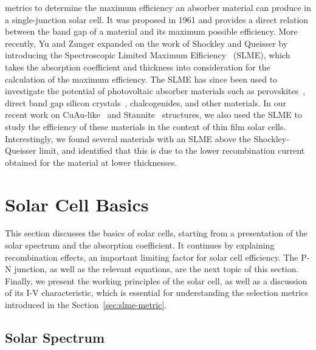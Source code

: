 \begin{refsection}
 
% 
metrics to determine the maximum efficiency an absorber material can produce 
in a single-junction solar cell. It was proposed in 1961 and provides a direct 
relation between the band gap of a material and its maximum possible 
efficiency. More recently, Yu and Zunger expanded on the work of Shockley and 
Queisser by introducing the Spectroscopic Limited Maximum 
Efficiency~\cite{Yu2012} (SLME), which takes the absorption coefficient and 
thickness into consideration for the calculation of the maximum efficiency. 
The SLME has since been used to investigate the potential of photovoltaic 
absorber materials such as perovskites~\cite{Meng2016}, direct band gap 
silicon crystals~\cite{Lee2014}, chalcogenides, and other materials. In our 
recent work on CuAu-like~\cite{Bercx2016} and Stannite~\cite{Sarmadian2016} 
structures, we also used the SLME to study the efficiency of these materials 
in the context of thin film solar cells. Interestingly, we found several 
materials with an SLME above the Shockley-Queisser limit, and identified that 
this is due to the lower recombination current obtained for the material at 
lower thicknesses. 
 
 
\section{Solar Cell Basics} \label{sec:slme-basics} 
 
This section discusses the basics of solar cells, starting from a presentation 
of the solar spectrum and the absorption coefficient. It continues by 
explaining recombination effects, an important limiting factor for solar cell 
efficiency. The P-N junction, as well as the relevant equations, are the next 
topic of this section. Finally, we present the working principles of the solar 
cell, as well as a discussion of its I-V characteristic, which is essential 
for understanding the selection metrics introduced in the 
Section~\ref{sec:slme-metric}. 
 
\subsection{Solar Spectrum} 
 

\end{refsection}
